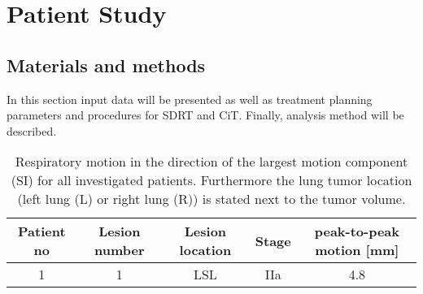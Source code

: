 \documentclass[type=dr, dr=rernat, accentcolor=tud7b,colorbacktitle, bigchapter, openright, twoside, 12pt ]{tudthesis}
\begin{document}
\chapter{Patient Study}

\section{Materials and methods}

In this section input data will be presented as well as treatment planning parameters and procedures for SDRT and CiT. Finally, analysis method will be described.



\begin{table}[H]
  \centering
  \caption{Respiratory motion in the direction of the largest motion component (SI) for all investigated patients.
  Furthermore the lung tumor 
  location (left lung (L) or right lung (R)) is stated next to the tumor volume.}
  \begin{tabular}{|c|c|c|c|c|}
    \hline\hline
    Patient no & Lesion number & Lesion location & Stage &
    peak-to-peak motion [mm]\\
    \hline
    1 & 1 & LSL & IIa & 4.8  \\
    \hline\hline
  \end{tabular}
  \label{tab:patdata}
\end{table}


% 
% 
\end{document}
